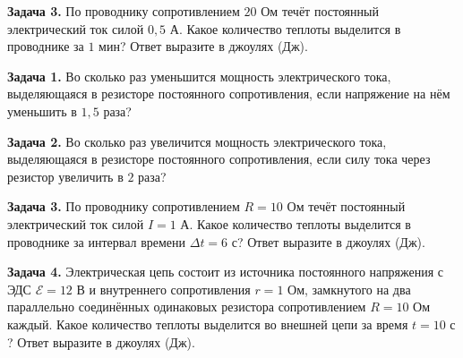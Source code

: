 \begin{taskbasic}[code={\label{task:elem_pow_v10_n11}}]
\textbf{Задача 3.} По проводнику сопротивлением $20\text{ Ом}$ течёт постоянный электрический ток силой $0{,}5\text{ А}$. Какое количество теплоты выделится в проводнике за $1\text{ мин}$? Ответ выразите в джоулях (Дж).

\end{taskbasic}


\begin{taskbasic}[code={\label{task:elem_pow_v23_n11}}]
\textbf{Задача 1.} Во сколько раз уменьшится мощность электрического тока, выделяющаяся в резисторе постоянного сопротивления, если напряжение на нём уменьшить в $1{,}5$ раза?

\end{taskbasic}

\begin{taskbasic}[code={\label{task:elem_pow_v24_n11}}]
\textbf{Задача 2.} Во сколько раз увеличится мощность электрического тока, выделяющаяся в резисторе постоянного сопротивления, если силу тока через резистор увеличить в $2$ раза?

\end{taskbasic}

\begin{taskbasic}[code={\label{task:elem_pow_v27_n23}}]
\textbf{Задача 3.} По проводнику сопротивлением $R = 10\text{ Ом}$ течёт постоянный электрический ток силой $I = 1\text{ А}$. Какое количество теплоты выделится в проводнике за интервал времени $\Delta t = 6\text{ с}$? Ответ выразите в джоулях (Дж).

\end{taskbasic}

\begin{taskbasic}[code={\label{task:elem_pow_v28_n25}}]
\textbf{Задача 4.} Электрическая цепь состоит из источника постоянного напряжения с ЭДС $\mathcal{E} = 12\text{ В}$ и внутреннего сопротивления $r = 1\text{ Ом}$, замкнутого на два параллельно соединённых одинаковых резистора сопротивлением $R = 10\text{ Ом}$ каждый. Какое количество теплоты выделится во внешней цепи за время $t = 10\text{ с}$? Ответ выразите в джоулях (Дж).

\end{taskbasic}
